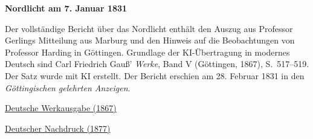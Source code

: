 \clearpage
\thispagestyle{empty}
\begin{center}\Large\textbf{Nordlicht am 7. Januar 1831}\end{center}

Der vollständige Bericht über das Nordlicht enthält den Auszug aus Professor Gerlings Mitteilung aus Marburg und den Hinweis auf die Beobachtungen von Professor Harding in Göttingen. Grundlage der KI-Übertragung in modernes Deutsch sind Carl Friedrich Gauß’ \textit{Werke}, Band V (Göttingen, 1867), S.~517--519. Der Satz wurde mit KI erstellt. Der Bericht erschien am 28. Februar 1831 in den \textit{Göttingischen gelehrten Anzeigen}.

\medskip\noindent
\href{https://gdz.sub.uni-goettingen.de/id/PPN236006339}{Deutsche Werkausgabe (1867)}\par
\noindent\href{https://doi.org/10.1007/978-3-642-49319-5_27}{Deutscher Nachdruck (1877)}
\clearpage

